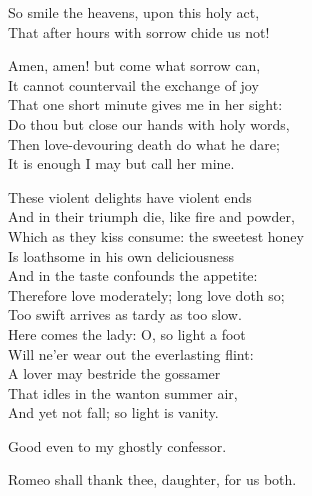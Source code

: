  
\begin{speech}
So smile the heavens, upon this holy act, \\
That after hours with sorrow chide us not! \\
\end{speech}
\begin{speech}
Amen, amen! but come what sorrow can, \\
It cannot countervail the exchange of joy \\
That one short minute gives me in her sight: \\
Do thou but close our hands with holy words, \\
Then love-devouring death do what he dare; \\
It is enough I may but call her mine. \\
\end{speech}
\begin{speech}
These violent delights have violent ends \\
And in their triumph die, like fire and powder, \\
Which as they kiss consume: the sweetest honey \\
Is loathsome in his own deliciousness \\
And in the taste confounds the appetite: \\
Therefore love moderately; long love doth so; \\
Too swift arrives as tardy as too slow.  \\

Here comes the lady: O, so light a foot \\
Will ne'er wear out the everlasting flint: \\
A lover may bestride the gossamer \\
That idles in the wanton summer air, \\
And yet not fall; so light is vanity. \\
\end{speech}
\begin{speech}
Good even to my ghostly confessor. \\
\end{speech}
\begin{speech}
Romeo shall thank thee, daughter, for us both.
\\
\end{speech}
